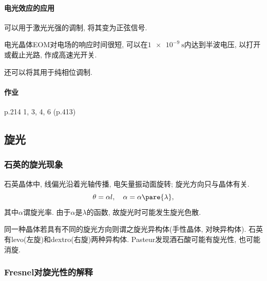 \documentclass{ctexart}
\begin{document}
\paragraph{电光效应的应用} %
\label{par:电光效应的应用}

可以用于激光光强的调制, 将其变为正弦信号. 
\par
电光晶体EOM对电场的响应时间很短, 可以在$\SI{1e-9}{\second}$内达到半波电压, 以打开或截止光路, 作成高速光开关.
\par
还可以将其用于纯相位调制.


\paragraph{作业} %
\label{par:作业}

p.214 1, 3, 4, 6 (p.413)




\subsection{旋光} %
\label{sub:旋光}

\subsubsection{石英的旋光现象} %
\label{ssub:石英的旋光现象}

石英晶体中, 线偏光沿着光轴传播, 电矢量振动面旋转; 旋光方向只与晶体有关.
\[ \theta = \alpha l,\quad \alpha = \alpha\pare{\lambda}, \]
其中$\alpha$谓旋光率. 由于$\alpha$是$\lambda$的函数, 故旋光时可能发生旋光色散.
\par
同一种晶体若具有不同的旋光方向则谓之旋光异构体(手性晶体, 对映异构体). 石英有levo(左旋)和dextro(右旋)两种异构体. Pasteur发现酒石酸可能有旋光性, 也可能消旋.


\subsubsection{Fresnel对旋光性的解释} %
\label{ssub:fresnel对旋光性的解释}
\end{document}
